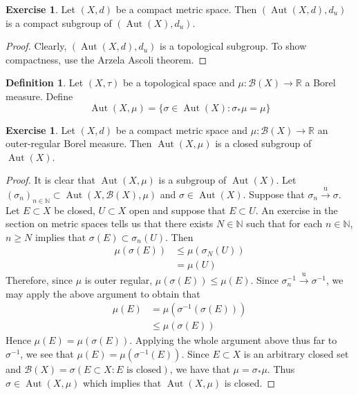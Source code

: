 \documentclass[12pt]{amsart}
\theoremstyle{definition}
\newtheorem{defn}[definition]{Definition}
\newtheorem{ex}[definition]{Exercise}
\newcommand{\sig}{\sigma}
\newcommand{\N}{\mathbb{N}}
\newcommand{\R}{\mathbb{R}}
\newcommand{\MB}{\mathcal{B}}
\newcommand{\convt}[1]{\xrightarrow{\text{#1}}}
\DeclareMathOperator{\Aut}{Aut}
\begin{document}
	\begin{ex}
	Let $(X, d)$ be a compact metric space. Then $(\Aut(X, d), d_u)$ is a compact subgroup of $(\Aut(X), d_u)$.
	\end{ex}
	
	\begin{proof}
	Clearly, $(\Aut(X, d), d_u)$ is a topological subgroup. To show compactness, use the Arzela Ascoli theorem.
	\end{proof}
	
	\begin{defn}
	Let $(X, \tau)$ be a topological space and $\mu: \MB(X) \rightarrow \R$ a Borel measure. Define $$\Aut(X, \mu) = \{\sig \in \Aut(X): \sig_* \mu = \mu\}$$ 
	\end{defn}	
	
	\begin{ex}
	Let $(X,d)$ be a compact metric space and $\mu: \MB(X) \rightarrow \R$ an outer-regular Borel measure. Then $\Aut(X, \mu)$ is a closed subgroup of $\Aut(X)$.
	\end{ex}
	
	\begin{proof}
	It is clear that $\Aut(X, \mu)$ is a subgroup of $\Aut(X)$. Let $(\sig_n)_{n \in \N} \subset \Aut(X, \MB(X), \mu)$ and $\sig \in \Aut(X)$. Suppose that $\sig_n \convt{u} \sig$. Let $E \subset X$ be closed, $U \subset X$ open and suppose that $E \subset U$. An exercise in the section on metric spaces tells us that there exists $N \in \N$ such that for each $n \in \N$, $n \geq N$ implies that $\sig(E) \subset \sig_n(U)$. Then 
	\begin{align*}
	\mu(\sig(E)) 
	&\leq \mu(\sig_N(U)) \\
	&= \mu(U) 
	\end{align*}
	Therefore, since $\mu$ is outer regular, $\mu(\sig(E)) \leq \mu(E)$. Since $\sig_n^{-1} \convt{u} \sig^{-1}$, we may apply the above argument to obtain that 
	\begin{align*}
	\mu(E) 
	&= \mu(\sig^{-1}(\sig (E))) \\
	&\leq  \mu(\sig(E))
\end{align*}	 
Hence $\mu(E) = \mu(\sig(E))$. Applying the whole argument above thus far to $\sig^{-1}$, we see that $\mu(E) = \mu(\sig^{-1}(E))$. Since $E \subset X$ is an arbitrary closed set and $\MB(X) = \sig(E \subset X: E \text{ is closed})$, we have that $\mu = \sig_*\mu$. Thus $\sig \in \Aut(X, \mu)$ which implies that $\Aut(X, \mu)$ is closed. 
	\end{proof}
	
\end{document}
